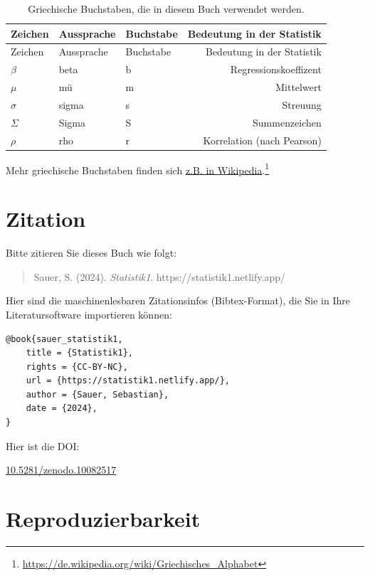 \documentclass[
  a4paper,
  DIV=11]{scrreprt}
\theoremstyle{definition}
\theoremstyle{definition}
\theoremstyle{definition}
\theoremstyle{remark}
\begin{document}
\begin{longtable}[]{@{}lllr@{}}
\caption{Griechische Buchstaben, die in diesem Buch verwendet
werden.}\label{tbl-griech}\tabularnewline
\toprule\noalign{}
Zeichen & Aussprache & Buchstabe & Bedeutung in der Statistik \\
\midrule\noalign{}
\endfirsthead
\toprule\noalign{}
Zeichen & Aussprache & Buchstabe & Bedeutung in der Statistik \\
\midrule\noalign{}
\endhead
\bottomrule\noalign{}
\endlastfoot
\(\beta\) & beta & b & Regressionskoeffizent \\
\(\mu\) & mü & m & Mittelwert \\
\(\sigma\) & sigma & s & Streuung \\
\(\Sigma\) & Sigma & S & Summenzeichen \\
\(\rho\) & rho & r & Korrelation (nach Pearson) \\
\end{longtable}

Mehr griechische Buchstaben finden sich
\href{https://de.wikipedia.org/wiki/Griechisches_Alphabet}{z.B. in
Wikipedia}.\footnote{\url{https://de.wikipedia.org/wiki/Griechisches_Alphabet}}

\section{Zitation}\label{zitation}

Bitte zitieren Sie dieses Buch wie folgt:

\begin{quote}
Sauer, S. (2024). \emph{Statistik1}. https://statistik1.netlify.app/
\end{quote}

Hier sind die maschinenlesbaren Zitationsinfos (Bibtex-Format), die Sie
in Ihre Literatursoftware importieren können:

\begin{verbatim}
@book{sauer_statistik1,
    title = {Statistik1},
    rights = {CC-BY-NC},
    url = {https://statistik1.netlify.app/},
    author = {Sauer, Sebastian},
    date = {2024},
}
\end{verbatim}

Hier ist die DOI:

\href{https://zenodo.org/doi/10.5281/zenodo.10082517}{10.5281/zenodo.10082517}

\section{Reproduzierbarkeit}\label{reproduzierbarkeit}
\end{document}
